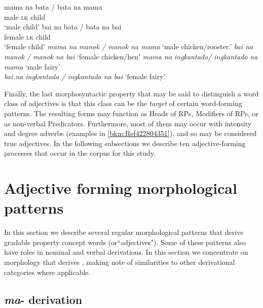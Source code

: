\ea
    \ea
        \gll mama  na  bata  /  bata na mama \\
        male  \textsc{lk} child \\
        \glt `male child’
    \ex
        \gll bai  na  bata  /  bata na bai \\
          female  \textsc{lk}  child \\
        \glt ‘female child’
    \z
\z
\ea
    \ea
        \textit{mama  na  manok   /  manok na mama}  {} `male chicken/rooster.'
    \ex 
        \textit{bai na manok / manok na bai} ‘female chicken/hen’
    \z
\z
\ea
    \ea
        \textit{mama  na  ingkantado\footnotemark / ingkantado na mama}  ‘male fairy’ \\
    \ex
        \textit{bai na ingkantada / ingkantada na bai}   ‘female fairy’
    \z
\z

Finally, the last morphosyntactic property that may be said to distinguish a word class of adjectives is that this class can be the \textit{target} of certain word-forming patterns. The resulting forms may function as Heads of RPs, Modifiers of RPs, or as non-verbal Predicators. Furthermore, most of them may occur with intensity and degree adverbs (examples in \ref{bkm:Ref422804351}), and so may be considered true adjectives. In the following subsections we describe ten adjective-forming processes that occur in the corpus for this study.

\section{Adjective forming morphological patterns}
\label{sec:adjectiveformingprocesses}  

In this section we describe several regular morphological patterns that derive gradable property concept words (or``adjectives"). Some of these patterns also have roles in nominal and verbal derivations. In this section we concentrate on morphology that derives , making note of similarities to other derivational categories where applicable.

\subsection{\textit{ma}{}- derivation}
\label{sec:ma-derivation}

